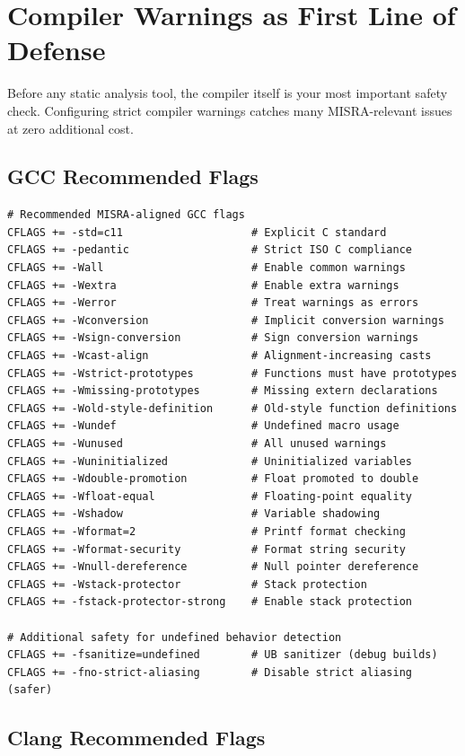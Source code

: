 \documentclass[11pt,letterpaper]{report}
\begin{document}
\chapter{Compiler Warnings as First Line of Defense}

Before any static analysis tool, the compiler itself is your most important safety check. Configuring strict compiler warnings catches many MISRA-relevant issues at zero additional cost.

\section{GCC Recommended Flags}

\begin{lstlisting}[style=bashstyle]
# Recommended MISRA-aligned GCC flags
CFLAGS += -std=c11                    # Explicit C standard
CFLAGS += -pedantic                   # Strict ISO C compliance
CFLAGS += -Wall                       # Enable common warnings
CFLAGS += -Wextra                     # Enable extra warnings
CFLAGS += -Werror                     # Treat warnings as errors
CFLAGS += -Wconversion                # Implicit conversion warnings
CFLAGS += -Wsign-conversion           # Sign conversion warnings
CFLAGS += -Wcast-align                # Alignment-increasing casts
CFLAGS += -Wstrict-prototypes         # Functions must have prototypes
CFLAGS += -Wmissing-prototypes        # Missing extern declarations
CFLAGS += -Wold-style-definition      # Old-style function definitions
CFLAGS += -Wundef                     # Undefined macro usage
CFLAGS += -Wunused                    # All unused warnings
CFLAGS += -Wuninitialized             # Uninitialized variables
CFLAGS += -Wdouble-promotion          # Float promoted to double
CFLAGS += -Wfloat-equal               # Floating-point equality
CFLAGS += -Wshadow                    # Variable shadowing
CFLAGS += -Wformat=2                  # Printf format checking
CFLAGS += -Wformat-security           # Format string security
CFLAGS += -Wnull-dereference          # Null pointer dereference
CFLAGS += -Wstack-protector           # Stack protection
CFLAGS += -fstack-protector-strong    # Enable stack protection

# Additional safety for undefined behavior detection
CFLAGS += -fsanitize=undefined        # UB sanitizer (debug builds)
CFLAGS += -fno-strict-aliasing        # Disable strict aliasing (safer)
\end{lstlisting}

\section{Clang Recommended Flags}
\end{document}
